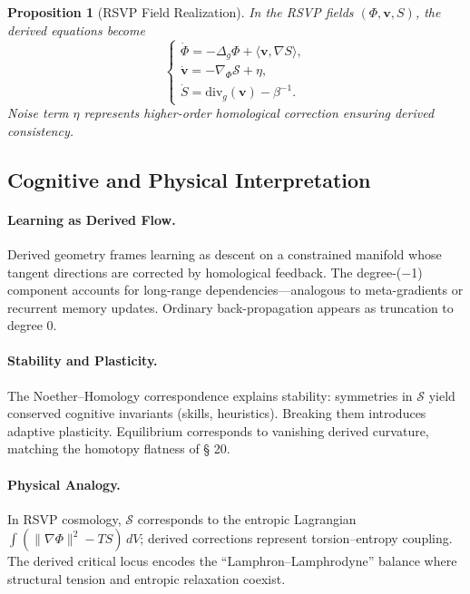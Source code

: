 \documentclass[12pt,a4paper,twoside,openright]{book}
\newtheorem{proposition}[theorem]{Proposition}
\begin{document}
\begin{proposition}[RSVP Field Realization]
In the RSVP fields \((\Phi,\mathbf{v},S)\),  
the derived equations become
\[
\begin{cases}
\dot{\Phi} = -\Delta_g \Phi + \langle\mathbf{v},\nabla S\rangle,\\[4pt]
\dot{\mathbf{v}} = -\nabla_{\!\Phi}\mathcal{S} + \eta,\\[4pt]
\dot{S}   =  \mathrm{div}_g(\mathbf{v}) - \beta^{-1}.
\end{cases}
\]
Noise term $\eta$ represents higher-order homological correction ensuring derived consistency.
\end{proposition}

\subsection*{Cognitive and Physical Interpretation}

\paragraph{Learning as Derived Flow.}
Derived geometry frames learning as descent on a constrained manifold whose tangent directions are corrected by homological feedback.  
The degree-(−1) component accounts for long-range dependencies—analogous to meta-gradients or recurrent memory updates.  
Ordinary back-propagation appears as truncation to degree 0.

\paragraph{Stability and Plasticity.}
The Noether–Homology correspondence explains stability: symmetries in $\mathcal{S}$ yield conserved cognitive invariants (skills, heuristics).  
Breaking them introduces adaptive plasticity.  
Equilibrium corresponds to vanishing derived curvature, matching the homotopy flatness of § 20.

\paragraph{Physical Analogy.}
In RSVP cosmology, $\mathcal{S}$ corresponds to the entropic Lagrangian $\int (\|\nabla\Phi\|^2 - T S)\,dV$;  
derived corrections represent torsion–entropy coupling.  
The derived critical locus encodes the “Lamphron–Lamphrodyne” balance where structural tension and entropic relaxation coexist.
\end{document}
